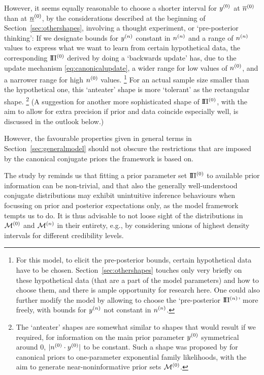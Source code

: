 However, it seems equally reasonable to choose %
a shorter interval for $y^{(0)}$ at $\overline{n}^{(0)}$ than at $\underline{n}^{(0)}$,
by the considerations described at the beginning of Section~\ref{sec:othershapes},
involving a thought experiment, or `pre-posterior thinking':
If we designate bounds for $y^{(n)}$ constant in $n^{(n)}$ and a range of $n^{(n)}$ values
to express what we want to learn from certain hypothetical data,
the corresponding $\text{I}\!\Pi^{(0)}$ derived by doing a `backwards update' has,
due to the update mechanism \eqref{eq:canonicalupdate},
a wider range for low values of $n^{(0)}$, and a narrower range for high $n^{(0)}$ values.%
\footnote{For this model, to elicit the pre-posterior bounds, certain hypothetical data have to be chosen.
Section~\ref{sec:othershapes} touches only very briefly on these hypothetical data
(that are a part of the model parameters) and how to choose them,
and there is ample opportunity for research here.
One could also further modify the model by allowing to choose
the `pre-posterior $\text{I}\!\Pi^{(n)}$' more freely, with bounds for $y^{(n)}$ not constant in $n^{(n)}$.}
For an actual sample size smaller than the hypothetical one,
this `anteater' shape is more `tolerant' as the rectangular shape.%
\footnote{The `anteater' shapes are somewhat similar to shapes that would result
if we required, for information on the main prior parameter $y^{(0)}$ symmetrical around $0$,
$|n^{(0)} \cdot y^{(0)}|$ to be constant.
Such a shape was proposed by \textcite{2012:benavolizaffalon}
for canonical priors to one-parameter exponential family likelihoods,
with the aim to generate near-noninformative prior sets $\mathcal{M}^{(0)}$.}
%
(A suggestion for another more sophisticated shape of $\text{I}\!\Pi^{(0)}$,
with the aim to allow for extra precision if prior and data coincide especially well,
is discussed in the outlook below.)

However, the favourable properties given in general terms in Section~\ref{sec:generalmodel}
should not obscure the restrictions that are imposed by the canonical conjugate priors
the framework is based on. 

The study by \textcite[see the discussion in Section~\ref{sec:alternatives:whitcomb}]{2011:krautenbacher}
reminds us that fitting a prior parameter set $\text{I}\!\Pi^{(0)}$
to available prior information can be non-trivial,
and that also the generally well-understood conjugate distributions may exhibit
unintuitive inference behaviours when focussing on prior and posterior expectations only,
as the model framework tempts us to do.
It is thus advisable to not loose sight of the distributions in $\mathcal{M}^{(0)}$ and $\mathcal{M}^{(n)}$ in their entirety, %
e.g., by considering unions of highest density intervals for different credibility levels.

